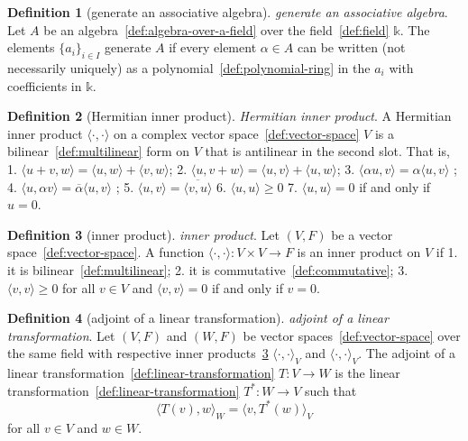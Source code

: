 \documentclass[12pt,a4paper]{article}
\theoremstyle{definition}
\newtheorem{definition}{Definition}
\begin{document}
\begin{definition}[generate an associative algebra]\label{def:generate-an-associative-algebra}
\emph{generate an associative algebra}. Let $A$ be an algebra~\ref{def:algebra-over-a-field} over the field~\ref{def:field} $\mathbb k$. The elements $\{a_i\}_{i\in I}$ generate $A$ if every element $\alpha\in A$ can be written (not necessarily uniquely) as a polynomial~\ref{def:polynomial-ring} in the $a_i$ with coefficients in $\mathbb k$.
\end{definition}

\begin{definition}[Hermitian inner product]\label{def:hermitian-inner-product}
\emph{Hermitian inner product}. A Hermitian inner product $\langle\cdot,\cdot\rangle$ on a complex vector space~\ref{def:vector-space} $V$ is a bilinear~\ref{def:multilinear} form on $V$ that is antilinear in the second slot. That is,
1. $\langle u+v,w\rangle = \langle u,w\rangle +\langle v,w\rangle$;
2. $\langle u,v+w\rangle = \langle u,v\rangle +\langle u,w\rangle$;
3. $\langle \alpha u ,v\rangle = \alpha\langle u,v\rangle$ ;
4. $\langle u ,\alpha v\rangle = \overline\alpha\langle u,v\rangle$ ;
5. $\langle u,v\rangle = \overline{\langle v,u\rangle}$
6. $\langle u,u \rangle \geq 0$
7. $\langle u,u \rangle = 0$ if and only if $u=0$.
\end{definition}

\begin{definition}[inner product]\label{def:inner-product}
\emph{inner product}. Let $(V,F)$ be a vector space~\ref{def:vector-space}. A function $\langle\cdot,\cdot\rangle: V\times V \to F$ is an inner product on $V$ if 
1. it is bilinear~\ref{def:multilinear};
2. it is commutative~\ref{def:commutative};
3. $\langle v, v\rangle \geq 0$ for all $v \in V$ and $\langle v,v\rangle = 0$ if and only if $v=0$.
\end{definition}

\begin{definition}[adjoint of a linear transformation]\label{def:adjoint-of-a-linear-transformation}
\emph{adjoint of a linear transformation}. Let $(V,F)$ and $(W,F)$ be vector spaces~\ref{def:vector-space} over the same field with respective inner products~\ref{def:inner-product} $\langle\cdot,\cdot\rangle_V$ and $\langle\cdot,\cdot\rangle_V$. The adjoint of a linear transformation~\ref{def:linear-transformation} $T:V\to W$ is the linear transformation~\ref{def:linear-transformation} $T^*: W \to V$ such that $$\langle T(v), w\rangle_W = \langle v, T^*(w)\rangle_V$$ for all $v \in V$ and $w \in W$.
\end{definition}
\end{document}
